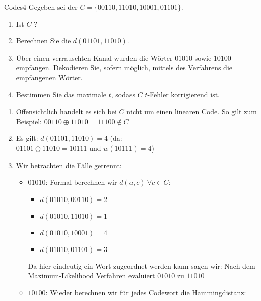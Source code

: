 \begin{aufgabe}{Codes}{4}
Gegeben sei der  $C = \{ 00110, 11010, 10001, 01101 \}$.
\begin{enumerate}[label=\alph*)]
    \item Ist $C$ ?
    \item Berechnen Sie die  $d(01101, 11010)$.
    \item Über einen verrauschten Kanal wurden die Wörter $01010$ sowie $10100$ empfangen.
    Dekodieren Sie, sofern möglich, mittels des  Verfahrens die empfangenen Wörter.
    \item Bestimmen Sie das maximale $t$, sodass $C$ $t$-Fehler korrigierend ist.
\end{enumerate}
\Splitter
\vspace{-1\baselineskip}
\begin{enumerate}[label=\alph*)]\narrowitems
    \item Offensichtlich handelt es sich bei $C$ nicht um einen linearen Code. So gilt zum Beispiel: \(00110 \oplus 11010 = 11100 \not\in C\)
    \item Es gilt: \(d(01101, 11010) = 4\) (da: \(01101 \oplus 11010 = 10111 \text{ und } w(10111) = 4\))
    \item Wir betrachten die Fälle getrennt:
    \begin{itemize}[label=--]\narrowitems
        \item $01010$: Formal berechnen wir \(d(a, c)~\forall c \in C\): \begin{multicols}{2}
            \begin{itemize}[label=]\narrowitems
                \item \(d(01010, 00110) = 2\)
                \item \(d(01010, 11010) = 1\)
                \item \(d(01010, 10001) = 4\)
                \item \(d(01010, 01101) = 3\)
            \end{itemize}
        \end{multicols}
        Da hier eindeutig ein Wort zugeordnet werden kann sagen wir: Nach dem Maximum-Likelihood Verfahren evaluiert $01010$ zu $11010$
        \item $10100$: Wieder berechnen wir für jedes Codewort die Hammingdistanz:
        \begin{multicols}{2}
            \begin{itemize}[label=]\narrowitems

\end{itemize}
\end{multicols}
\end{itemize}
\end{enumerate}
\end{aufgabe}
